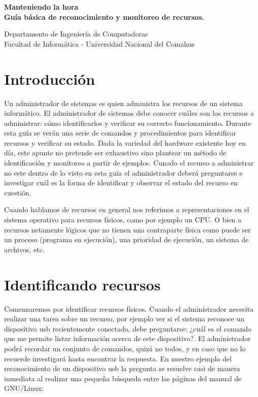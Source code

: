 \documentclass[12pt]{article}
\def\maketitle{

 \makeatletter
 {\color{bl} \centering \huge \sc \textbf{
 Manteniendo la hora \\ 
\large \vspace*{-8pt} \color{black} Guía básica de reconocimiento y monitoreo de recursos. 
 \vspace*{8pt} }\par}
 \makeatother


 \makeatletter
 {\centering \small 
 	Departamento de Ingeniería de Computadoras \\
 	Facultad de Informática - Universidad Nacional del Comahue \\
 	\vspace{20pt} }
 \makeatother

}
\begin{document}
\thispagestyle{empty}
\maketitle
\setlength{\parindent}{0pt}

\section*{Introducción}

Un administrador de sistemas es quien administra los recursos de un sistema informático. El administrador
de sistemas debe conocer cuáles son los recursos a administrar: cómo identificarlos y verificar su 
correcto funcionamiento. Durante esta guía se verán una serie de comandos y procedimientos para identificar 
recursos y verificar su estado. Dada la variedad del hardware existente hoy en día, este apunte no pretende
ser exhaustivo sino plantear un método de identificación y monitoreo a partir de ejemplos. Cunado 
el recurso a administrar no este dentro de lo visto en esta guía el administrador deberá preguntarse e
investigar cuál es la forma de identificar y observar el estado del recurso en cuestión. 

Cuando hablamos de recursos en general nos referimos a representaciones en el sistema operativo para 
recursos físicos, como por ejemplo un CPU. O bien a recursos netamente lógicos que no tienen una
contraparte física como puede ser un proceso (programa en ejecución), una prioridad de ejecución, 
un sistema de archivos, etc. 


\section*{Identificando recursos}


Comenzaremos por identificar recursos físicos. Cuando el administrador necesita realizar una tarea
sobre un recurso, por ejemplo ver si el sistema reconoce un dispositivo usb recientemente conectado, 
debe preguntarse: ¿cuál es el comando que me permite listar información acerca de este dispositivo?. 
El administrador podrá recordar un conjunto de comandos, quizá no todos, y en caso que no lo recuerde
investigará hasta encontrar la respuesta. En nuestro ejemplo del reconocimiento de un dispositivo 
usb la pregunta se resuelve casi de manera inmediata al realizar una pequeña búsqueda entre las páginas
del manual de GNU/Linux: 
\end{document}
